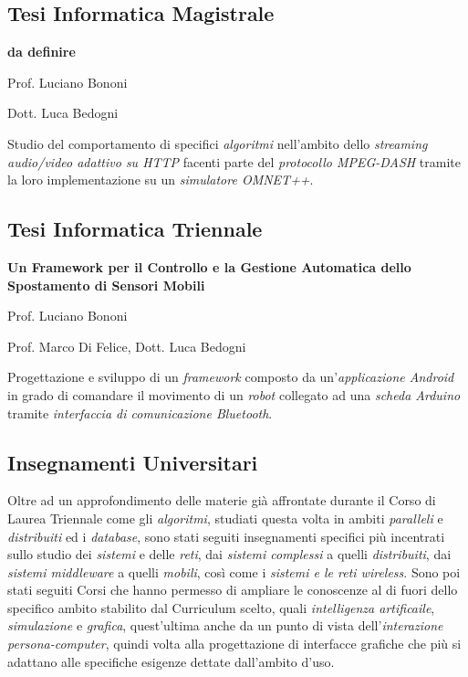 \subsection{Tesi Informatica Magistrale}

{\textbf{da definire}}

{Prof. Luciano Bononi}

{Dott. Luca Bedogni}

{Studio del comportamento di specifici \textit{algoritmi} nell'ambito dello
\textit{streaming audio/video adattivo su HTTP} facenti parte del
\textit{protocollo MPEG-DASH} tramite la loro implementazione su un
\textit{simulatore OMNET++}.}



\subsection{Tesi Informatica Triennale}

{\textbf{Un Framework per il Controllo e la Gestione Automatica dello
Spostamento di Sensori Mobili}}

{Prof. Luciano Bononi}

{Prof. Marco Di Felice, Dott. Luca Bedogni}

{Progettazione e sviluppo di un \textit{framework} composto da
un'\textit{applicazione Android} in grado di comandare il movimento di un
\textit{robot} collegato ad una \textit{scheda Arduino} tramite
\textit{interfaccia di comunicazione Bluetooth}.}

\subsection{Insegnamenti Universitari}

{Oltre ad un approfondimento delle materie già affrontate durante il Corso di
Laurea Triennale come gli \textit{algoritmi}, studiati questa volta in ambiti
\textit{paralleli} e \textit{distribuiti} ed i \textit{database}, sono stati
seguiti insegnamenti specifici più incentrati sullo studio dei \textit{sistemi}
e delle \textit{reti}, dai \textit{sistemi complessi} a quelli
\textit{distribuiti}, dai \textit{sistemi middleware} a quelli \textit{mobili},
così come i \textit{sistemi e le reti wireless}. Sono poi stati seguiti Corsi
che hanno permesso di ampliare le conoscenze al di fuori dello specifico ambito
stabilito dal Curriculum scelto, quali \textit{intelligenza artificaile},
\textit{simulazione} e \textit{grafica}, quest'ultima anche da un punto di vista
dell'\textit{interazione persona-computer}, quindi volta alla progettazione di
interfacce grafiche che più si adattano alle specifiche esigenze dettate
dall'ambito d'uso.}

